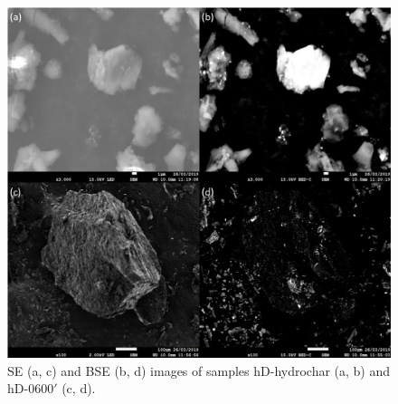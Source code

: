 \begin{figure}[t!]
    \centering
    \includegraphics[width=\columnwidth, keepaspectratio]{4-cbs/figs/SEM_BSE.png}
    \caption{SE (a, c) and BSE (b, d) images of samples hD-hydrochar (a, b) and hD-0600$'$ (c, d).}
    \label{fig:SEM_BSE}
\end{figure}

